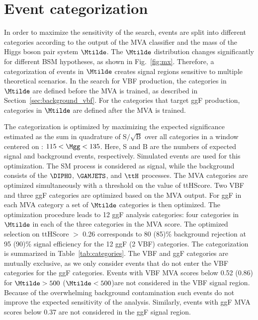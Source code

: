 \documentclass[11pt,a4paper,cmspaper,final,collab]{cms-tdr}
\begin{document}
\section{Event categorization}
\label{sec:categor}
In order to maximize the sensitivity of the search, events are split into different categories
according to the output of the MVA classifier 
and the mass of the Higgs boson pair system $\Mtilde$. The $\Mtilde$ distribution changes significantly for different BSM hypotheses, as shown in Fig.~\ref{fig:mx}. Therefore, a categorization of \HH events in $\Mtilde$ creates signal regions sensitive to multiple theoretical scenarios. In the search for VBF \HH production, the categories in $\Mtilde$ are defined before the MVA is trained, as described in Section~\ref{sec:background_vbf}. 
For the categories that target ggF \HH production, categories in $\Mtilde$ are defined after the MVA is trained.


The categorization is optimized by maximizing the expected significance estimated as the sum in quadrature of $\mathrm{S}/\sqrt{\mathrm{B}}$ over all categories in a window centered on \mH: $115<\Mgg<135$\GeV. Here, S and B are
the numbers of expected signal and background events, respectively.
 Simulated events are used for this optimization. The SM \HH process is considered as signal, while the background consists of the $\DIPHO$, $\GAMJETS$, and $\ttH$ processes. The MVA categories are optimized simultaneously with a threshold on the value of \mbox{ttHScore}. Two VBF and three ggF categories are optimized based on the MVA output. For ggF \HH in each MVA category a set of $\Mtilde$ categories is then optimized. The optimization procedure leads to 12 ggF analysis categories: four categories in $\Mtilde$ in each of the three categories in the MVA score. The optimized selection on \mbox{ttHScore} $>$ 0.26 corresponds to 80 (85)\% \ttH background rejection at 95 (90)\% signal efficiency for the 12 ggF (2 VBF) categories. 
The categorization is summarized in Table~\ref{tab:categories}. 
The VBF and ggF categories are mutually exclusive, as we only consider events that do not enter the VBF categories for the ggF categories. 
Events with VBF MVA scores below 0.52 (0.86) for $\Mtilde>500$ ($\Mtilde<500$)\GeV are not considered in the VBF signal region. Because of the overwhelming background contamination such events do not
improve the expected sensitivity of the analysis. Similarly, events with ggF MVA scores below 0.37 are not considered in the ggF signal region. 
\end{document}
